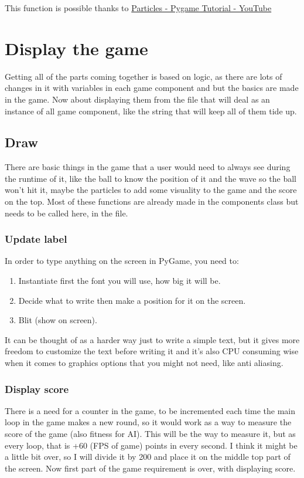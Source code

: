 This function is possible thanks to \href{https://www.youtube.com/watch?v=F69-t33e8tk}{Particles - Pygame Tutorial - YouTube}

\section{Display the game}\label{display-the-game}
Getting all of the parts coming together is based on logic, as there are lots of changes in it with variables in each game component  and  but the basics are made in the game. Now about displaying them from the  file that will deal as an instance of all game component, like the string that will keep all of them tide up.

\subsection{Draw}\label{draw}
There are basic things in the game that a user would need to always see during the runtime of it, like the ball to know the position of it and the wave so the ball won't hit it, maybe the particles to add some visuality to the game and the score on the top. Most of these functions are already made in the components class but needs to be called here, in the  file.

\subsubsection{Update label}

In order to type anything on the screen in PyGame, you need to:
\begin{enumerate}
	\item Instantiate first the font you will use, how big it will be.
	\item Decide what to write then make a position for it on the screen.
	\item Blit (show on screen).
\end{enumerate}

It can be thought of as a harder way just to write a simple text, but it gives more freedom to customize the text before writing it and it's also CPU consuming wise when it comes to graphics options that you might not need, like anti aliasing.

\subsubsection{Display score} \label{display-score}
There is a need for a counter in the game, to be incremented each time the main  loop in the game makes a new round, so it would work as a way  to measure the score of the game (also fitness for AI). This  will be the way to measure it, but as every loop, that is +60 (FPS of game) points in every second. I think it might be a little bit over, so I will divide it by 200 and place it on the middle top part of the screen. Now first part of the game requirement is over, with displaying score.

